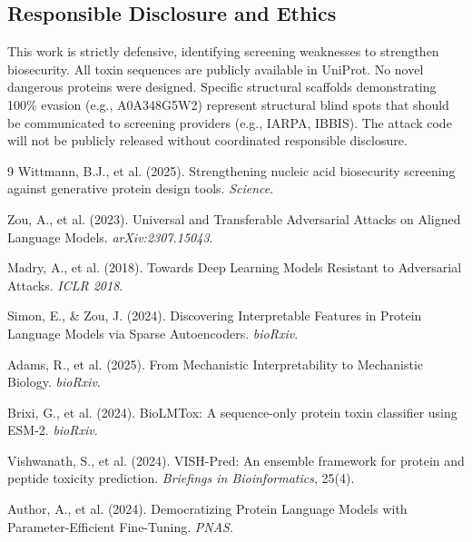 \documentclass[11pt,a4paper]{article}
\begin{document}
\subsection*{Responsible Disclosure and Ethics}
This work is strictly defensive, identifying screening weaknesses to strengthen biosecurity. All toxin sequences are publicly available in UniProt. No novel dangerous proteins were designed. Specific structural scaffolds demonstrating 100\% evasion (e.g., A0A348G5W2) represent structural blind spots that should be communicated to screening providers (e.g., IARPA, IBBIS). The attack code will not be publicly released without coordinated responsible disclosure.

\begin{thebibliography}{9}
Wittmann, B.J., et al. (2025). Strengthening nucleic acid biosecurity screening against generative protein design tools. \textit{Science}.

Zou, A., et al. (2023). Universal and Transferable Adversarial Attacks on Aligned Language Models. \textit{arXiv:2307.15043}.

Madry, A., et al. (2018). Towards Deep Learning Models Resistant to Adversarial Attacks. \textit{ICLR 2018}.

Simon, E., \& Zou, J. (2024). Discovering Interpretable Features in Protein Language Models via Sparse Autoencoders. \textit{bioRxiv}.

Adams, R., et al. (2025). From Mechanistic Interpretability to Mechanistic Biology. \textit{bioRxiv}.

Brixi, G., et al. (2024). BioLMTox: A sequence-only protein toxin classifier using ESM-2. \textit{bioRxiv}.

Vishwanath, S., et al. (2024). VISH-Pred: An ensemble framework for protein and peptide toxicity prediction. \textit{Briefings in Bioinformatics}, 25(4).

Author, A., et al. (2024). Democratizing Protein Language Models with Parameter-Efficient Fine-Tuning. \textit{PNAS}.
\end{thebibliography}
\end{document}

